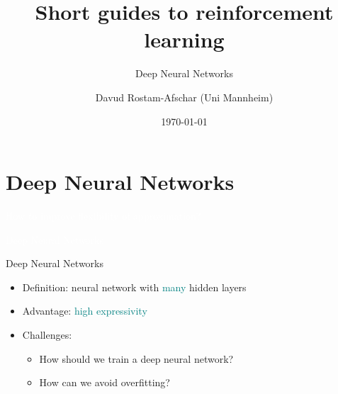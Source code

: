 \documentclass[11pt,table]{beamer}
\title[]{Short guides to reinforcement learning}
\subtitle[]{Deep Neural Networks}
\author[D. Rostam-Afschar]{\textcolor{gray1}{Davud Rostam-Afschar (Uni Mannheim)}}
\date[]{\today}
\begin{document}
\begin{frame}[plain]
  \titlepage
\end{frame}


\section{Deep Neural Networks}
{
\begin{frame}
\centering
\Huge
\textcolor{white}{How to improve flexibility of approximation?}
\thispagestyle{empty}
\end{frame}
}


{
\begin{frame}
\centering
\Huge
\textcolor{white}{Deep Neural Networks}
\thispagestyle{empty}
\end{frame}
}


\begin{frame}{Deep Neural Networks}


\begin{itemize}
    \item Definition: neural network with \textcolor{teal}{many} hidden layers

\item Advantage: \textcolor{teal}{high expressivity}
 \item Challenges:
\begin{itemize}
    \item \textcolor{red1}{How should we train a deep neural network?}
\item \textcolor{red1}{How can we avoid overfitting?}
 
\end{itemize}
    
   
\end{itemize}
    \citep{goodfellow2016deep}    

\end{frame}
\end{document}
